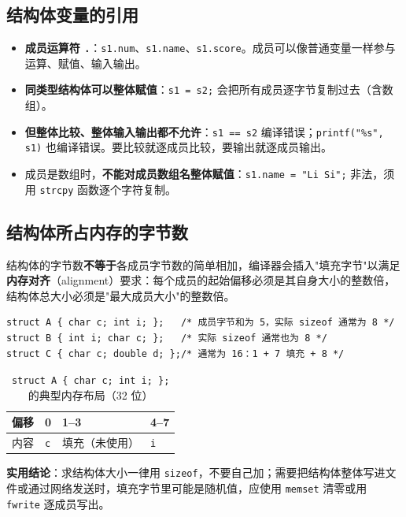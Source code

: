 \subsection{结构体变量的引用}
\begin{itemize}
  \item \textbf{成员运算符 \texttt{.}}：\texttt{s1.num}、\texttt{s1.name}、\texttt{s1.score}。成员可以像普通变量一样参与运算、赋值、输入输出。
  \item \textbf{同类型结构体可以整体赋值}：\texttt{s1 = s2;} 会把所有成员逐字节复制过去（含数组）。
  \item \textbf{但整体比较、整体输入输出都不允许}：\texttt{s1 == s2} 编译错误；\texttt{printf("\%s", s1)} 也编译错误。要比较就逐成员比较，要输出就逐成员输出。
  \item 成员是数组时，\textbf{不能对成员数组名整体赋值}：\texttt{s1.name = "Li Si";} 非法，须用 \texttt{strcpy} 函数逐个字符复制。
\end{itemize}

\subsection{结构体所占内存的字节数}
结构体的字节数\textbf{不等于}各成员字节数的简单相加，编译器会插入"填充字节"以满足\textbf{内存对齐}（alignment）要求：每个成员的起始偏移必须是其自身大小的整数倍，结构体总大小必须是"最大成员大小"的整数倍。

\begin{lstlisting}
struct A { char c; int i; };   /* 成员字节和为 5，实际 sizeof 通常为 8 */
struct B { int i; char c; };   /* 实际 sizeof 通常也为 8 */
struct C { char c; double d; };/* 通常为 16：1 + 7 填充 + 8 */
\end{lstlisting}

\begin{table}[htbp]
\centering
\caption{\texttt{struct A \{ char c; int i; \};} 的典型内存布局（32 位）}
\footnotesize
\begin{tabular}{@{}llll@{}}
\toprule
偏移 & 0 & 1--3 & 4--7 \\
\midrule
内容 & \texttt{c} & 填充（未使用） & \texttt{i} \\
\bottomrule
\end{tabular}
\end{table}

\textbf{实用结论}：求结构体大小一律用 \texttt{sizeof}，不要自己加；需要把结构体整体写进文件或通过网络发送时，填充字节里可能是随机值，应使用 \texttt{memset} 清零或用 \texttt{fwrite} 逐成员写出。

